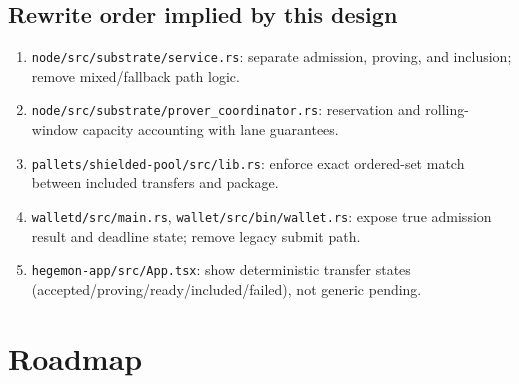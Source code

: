 \documentclass[11pt]{article}
\begin{document}
\subsection{Rewrite order implied by this design}

\begin{enumerate}[leftmargin=2em]
  \item \texttt{node/src/substrate/service.rs}: separate admission, proving,
        and inclusion; remove mixed/fallback path logic.
  \item \texttt{node/src/substrate/prover\_coordinator.rs}: reservation and
        rolling-window capacity accounting with lane guarantees.
  \item \texttt{pallets/shielded-pool/src/lib.rs}: enforce exact ordered-set
        match between included transfers and package.
  \item \texttt{walletd/src/main.rs}, \texttt{wallet/src/bin/wallet.rs}:
        expose true admission result and deadline state; remove legacy submit path.
  \item \texttt{hegemon-app/src/App.tsx}: show deterministic transfer states
        (accepted/proving/ready/included/failed), not generic pending.
\end{enumerate}

\section{Roadmap}
\end{document}
